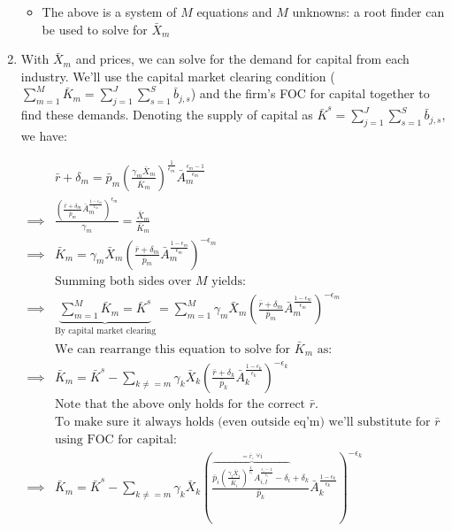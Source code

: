 \documentclass[letterpaper,12pt]{article}
\theoremstyle{definition}
\begin{document}
\begin{spacing}{1.5}
\begin{enumerate}
\begin{itemize}
	\item The above is a system of $M$ equations and $M$ unknowns: a root finder can be used to solve for $\bar{X}_{m}$
	\end{itemize}

\item With $\bar{X}_{m}$ and prices, we can solve for the demand for capital from each industry.  We'll use the capital market clearing condition ($\sum_{m=1}^{M} \bar{K}_{m}=\sum_{j=1}^{J}\sum_{s=1}^{S} \bar{b}_{j,s}$) and the firm's FOC for capital together to find these demands.  Denoting the supply of capital as $\bar{K}^{s}=\sum_{j=1}^{J}\sum_{s=1}^{S} \bar{b}_{j,s}$, we have:

		\begin{equation}
	\begin{split}
	& \bar{r}+\delta_{m} = \bar{p}_{m}\left(\frac{\gamma_{m}\bar{X}_{m}}{\bar{K}_{m}}\right)^{\frac{1}{\epsilon_{m}}}\bar{A}_{m}^{\frac{\epsilon_{m}-1}{\epsilon_{m}}} \\
	\implies & \frac{\left(\frac{\bar{r}+\delta_{m}}{\bar{p}_{m}}\bar{A}_{m}^{\frac{1-\epsilon_{m}}{\epsilon_{m}}}\right)^{\epsilon_{m}}}{\gamma_{m}} = \frac{\bar{X}_{m}}{\bar{K}_{m}} \\
	\implies &  \bar{K}_{m} = \gamma_{m}\bar{X}_{m} \left(\frac{\bar{r}+\delta_{m}}{\bar{p}_{m}}\bar{A}_{m}^{\frac{1-\epsilon_{m}}{\epsilon_{m}}}\right)^{-\epsilon_{m}} \\
	& \text{Summing both sides over $M$ yields:} \\
	\implies &  \underbrace{\sum_{m=1}^{M} \bar{K}_{m}= \bar{K}^{s}}_{\text{By capital market clearing}} =\sum_{m=1}^{M} \gamma_{m}\bar{X}_{m} \left(\frac{\bar{r}+\delta_{m}}{\bar{p}_{m}}\bar{A}_{m}^{\frac{1-\epsilon_{m}}{\epsilon_{m}}}\right)^{-\epsilon_{m}} \\
	& \text{We can rearrange this equation to solve for $\bar{K}_{m}$ as:}\\
	\implies & \bar{K}_{m} = \bar{K}^{s} -\sum_{k \neq=m} \gamma_{k}\bar{X}_{k} \left(\frac{\bar{r}+\delta_{k}}{\bar{p}_{k}}\bar{A}_{k}^{\frac{1-\epsilon_{k}}{\epsilon_{k}}}\right)^{-\epsilon_{k}}\\
	& \text{Note that the above only holds for the correct $\bar{r}$.  }\\
	& \text{To make sure it always holds (even outside eq'm) we'll substitute for $\bar{r}$} \\
	& \text{using FOC for capital:} \\
	\implies & \bar{K}_{m} = \bar{K}^{s} -\sum_{k \neq=m} \gamma_{k}\bar{X}_{k} \left(\frac{\overbrace{\bar{p}_{i}\left(\frac{\gamma_{i}\bar{X}_{i}}{\bar{K}_{i}}\right)^{\frac{1}{\epsilon_{i}}}A_{i,t}^{\frac{\epsilon_{i}-1}{\epsilon_{i}}}-\delta_{i}}^{=\bar{r}, \ \forall i}+\delta_{k}}{\bar{p}_{k}}\bar{A}_{k}^{\frac{1-\epsilon_{k}}{\epsilon_{k}}}\right)^{-\epsilon_{k}}\\
	\end{split}
	\end{equation}


\end{enumerate}
\end{spacing}
\end{document}
